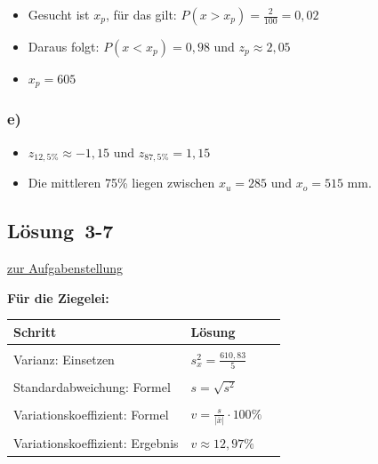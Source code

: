 \documentclass[
  11pt,
  ngerman,
  a4paper,
]{report}
\providecommand{\tightlist}{%
  \setlength{\itemsep}{0pt}\setlength{\parskip}{0pt}}
\begin{document}
\begin{itemize}
\tightlist
\item
  Gesucht ist \(x_p\), für das gilt: \(P(x>x_p) = \frac{2}{100}=0,02\)
\item
  Daraus folgt: \(P(x<x_p) = 0,98\) und \(z_p\approx2,05\)
\item
  \(x_p = 605\)
\end{itemize}

\hypertarget{e-1}{%
\subsubsection{e)}\label{e-1}}

\begin{itemize}
\tightlist
\item
  \(z_{12,5\%}\approx -1,15\) und \(z_{87,5\%}= 1,15\)
\item
  Die mittleren 75\% liegen zwischen \(x_u=285\) und \(x_o=515\) mm.
\end{itemize}

\hypertarget{loesung-3-7}{%
\subsection{Lösung~3-7}\label{loesung-3-7}}

\protect\hyperlink{aufgabe-3-7}{zur Aufgabenstellung}

\textbf{Für die Ziegelei:}

\begin{table}[H]
\centering
\begin{tabular}{>{\raggedright\arraybackslash}p{8cm}>{\raggedright\arraybackslash}p{8cm}}
\toprule
\textbf{Schritt} & \textbf{Lösung}\\
\midrule
\cellcolor{gray!6}{Varianz: Formel} & \cellcolor{gray!6}{$s^2=\frac{\sum\limits_{i=1}^{n}(x_{i}-\bar{x})^2}{n-1}$}\\
Varianz: Einsetzen & $s^2_x=\frac{610{,}83}{5}$\\
\cellcolor{gray!6}{Varianz: Ergebnis} & \cellcolor{gray!6}{$s^2_x=122{,}17$}\\
Standardabweichung: Formel & $s=\sqrt{s^2}$\\
\cellcolor{gray!6}{Standardabweichung: Ergebnis} & \cellcolor{gray!6}{$s_x\approx11{,}05$}\\
Variationskoeffizient: Formel & $v=\frac{s}{|\bar{x}|}\cdot100\%\quad$\\
\cellcolor{gray!6}{Variationskoeffizient: Einsetzen} & \cellcolor{gray!6}{$v\approx\frac{11{,}05}{85{,}17}\cdot100\%$}\\
Variationskoeffizient: Ergebnis & $v \approx 12{,}97\%$\\
\bottomrule
\end{tabular}
\end{table}
\end{document}
